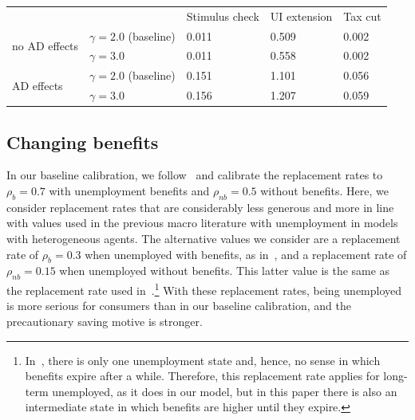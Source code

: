 \documentclass[\latexroot/\projectname]{subfiles}
\begin{document}
\begin{center}
  \begin{tabular}
    {@{}lllll@{}}
    \toprule
     &                           & Stimulus check & UI extension & Tax cut \\ \cmidrule(l){1-5}
    \multirow{2}{*}{no AD effects}
     & $\gamma = 2.0$ (baseline) & 0.011          & 0.509        & 0.002   \\
     & $\gamma = 3.0$            & 0.011          & 0.558        & 0.002   \\ \cmidrule(l){1-5}
    \multirow{2}{*}{AD effects}
     & $\gamma = 2.0$ (baseline) & 0.151          & 1.101        & 0.056   \\
     & $\gamma = 3.0$            & 0.156          & 1.207        & 0.059   \\ \cmidrule(l){1-5}
  \end{tabular}
  \label{tab:robustness_gamma_results}
\end{center}

\hypertarget{changing-benefits}{}\subsection*{Changing benefits}
\whenintegrated{\label{sec:robust_benefits}} %

In our baseline calibration, we follow~\cite{rothstein2017scraping} and calibrate the replacement rates to $\rho_b=0.7$ with unemployment benefits and $\rho_{nb}=0.5$ without benefits.
Here, we consider replacement rates that are considerably less generous and more in line with values used in the previous macro literature with unemployment in models with heterogeneous agents.
The alternative values we consider are a replacement rate of $\rho_{b}=0.3$ when unemployed with benefits, as in~\cite{carroll2020modeling}, and a replacement rate of $\rho_{nb}=0.15$ when unemployed without benefits.
This latter value is the same as the replacement rate used in~\cite{den2010computational}.\footnote{In~\cite{den2010computational}, there is only one unemployment state and, hence, no sense in which benefits expire after a while.
  Therefore, this replacement rate applies for long-term unemployed, as it does in our model, but in this paper there is also an intermediate state in which benefits are higher until they expire.} With these replacement rates, being unemployed is more serious for consumers than in our baseline calibration, and the precautionary saving motive is stronger.
\end{document}
